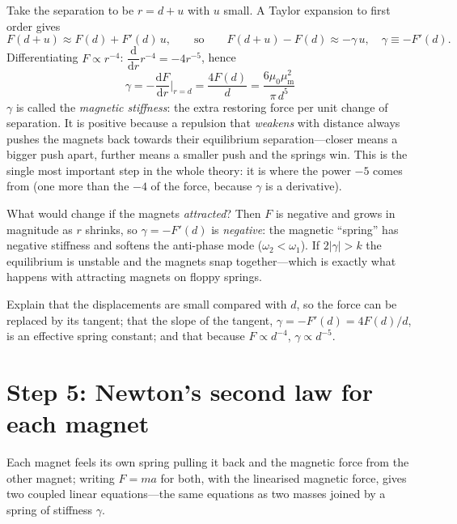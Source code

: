 \documentclass[11pt,a4paper]{article}
\newcommand{\muz}{\mu_0}
\newcommand{\mum}{\mu_{\mathrm m}}
\newcommand{\dd}{\mathrm{d}}
\begin{document}
Take the separation to be $r=d+u$ with $u$ small. A Taylor expansion to first order gives
\begin{equation}
F(d+u)\approx F(d)+F'(d)\,u,\qquad\text{so}\qquad F(d+u)-F(d)\approx-\gamma\,u,\quad \gamma\equiv-F'(d).
\end{equation}
Differentiating $F\propto r^{-4}$: $\dfrac{\dd}{\dd r}r^{-4}=-4r^{-5}$, hence
\begin{equation}
\boxed{\gamma=-\frac{\dd F}{\dd r}\bigg|_{r=d}=\frac{4F(d)}{d}=\frac{6\muz\mum^2}{\pi\,d^5}}
\end{equation}
$\gamma$ is called the \emph{magnetic stiffness}: the extra restoring force per unit change of separation. It is positive because a repulsion that \emph{weakens} with distance always pushes the magnets back towards their equilibrium separation---closer means a bigger push apart, further means a smaller push and the springs win. This is the single most important step in the whole theory: it is where the power $-5$ comes from (one more than the $-4$ of the force, because $\gamma$ is a derivative).

\begin{selfcheck}
What would change if the magnets \emph{attracted}? Then $F$ is negative and grows in magnitude as $r$ shrinks, so $\gamma=-F'(d)$ is \emph{negative}: the magnetic ``spring'' has negative stiffness and softens the anti-phase mode ($\omega_2<\omega_1$). If $2|\gamma|>k$ the equilibrium is unstable and the magnets snap together---which is exactly what happens with attracting magnets on floppy springs.
\end{selfcheck}

\begin{ownwords}
Explain that the displacements are small compared with $d$, so the force can be replaced by its tangent; that the slope of the tangent, $\gamma=-F'(d)=4F(d)/d$, is an effective spring constant; and that because $F\propto d^{-4}$, $\gamma\propto d^{-5}$.
\end{ownwords}

\bigskip
\section{Step 5: Newton's second law for each magnet}

\begin{idea}
Each magnet feels its own spring pulling it back and the magnetic force from the other magnet; writing $F=ma$ for both, with the linearised magnetic force, gives two coupled linear equations---the same equations as two masses joined by a spring of stiffness $\gamma$.
\end{idea}
\end{document}
